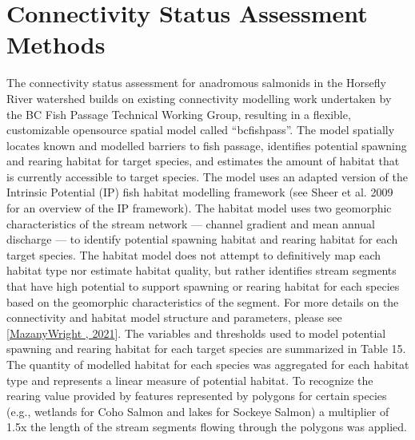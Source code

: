 \documentclass[letterpaper,10pt,english]{jupyterBook}
\begin{document}
\section{Connectivity Status Assessment Methods}
\label{\detokenize{AppendixA:connectivity-status-assessment-methods}}
\sphinxAtStartPar
The connectivity status assessment for anadromous salmonids in the Horsefly River watershed builds on existing connectivity modelling work undertaken by the BC Fish Passage Technical Working Group, resulting in a flexible, customizable open\sphinxhyphen{}source spatial model called “bcfishpass”. The model spatially locates known and modelled barriers to fish passage, identifies potential spawning and rearing habitat for target species, and estimates the amount of habitat that is currently accessible to target species. The model uses an adapted version of the Intrinsic Potential (IP) fish habitat modelling framework (see Sheer et al. 2009 for an overview of the IP framework). The habitat model uses two geomorphic characteristics of the stream network — channel gradient and mean annual discharge — to identify potential spawning habitat and rearing habitat for each target species. The habitat model does not attempt to definitively map each habitat type nor estimate habitat quality, but rather identifies stream segments that have high potential to support spawning or rearing habitat for each species based on the geomorphic characteristics of the segment. For more details on the connectivity and habitat model structure and parameters, please see {[}\hyperlink{cite.references:id12}{Mazany\sphinxhyphen{}Wright , 2021}{]}. The variables and thresholds used to model potential spawning and rearing habitat for each target species are summarized in Table 15. The quantity of modelled habitat for each species was aggregated for each habitat type and represents a linear measure of potential habitat. To recognize the rearing value provided by features represented by polygons for certain species (e.g., wetlands for Coho Salmon and lakes for Sockeye Salmon) a multiplier of 1.5x the length of the stream segments flowing through the polygons was applied.
\end{document}

